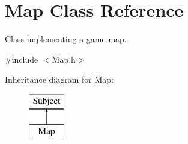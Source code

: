 \hypertarget{class_map}{}\section{Map Class Reference}
\label{class_map}


Class implementing a game map.  




{\ttfamily \#include $<$Map.\+h$>$}

Inheritance diagram for Map\+:\begin{figure}[H]
\begin{center}
\leavevmode
\includegraphics[height=2.000000cm]{class_map}
\end{center}
\end{figure}
